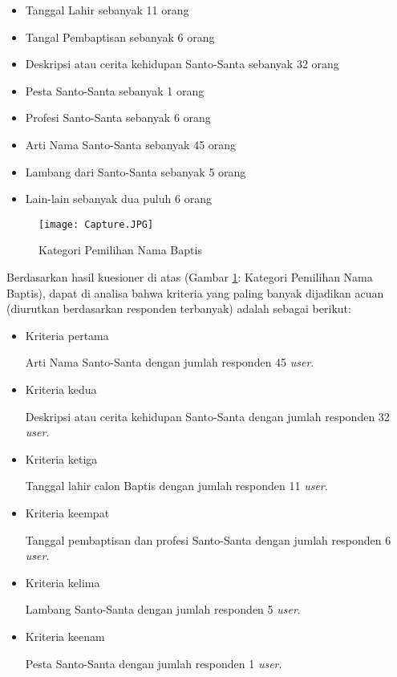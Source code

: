 \documentclass[a4paper,twoside]{article}
\begin{document}
\begin{enumerate}
\begin{itemize}
			\item Tanggal Lahir sebanyak 11 orang
			\item Tangal Pembaptisan sebanyak 6 orang
			\item Deskripsi atau cerita kehidupan Santo-Santa sebanyak 32 orang
			\item Pesta Santo-Santa sebanyak 1 orang
			\item Profesi Santo-Santa sebanyak 6 orang
			\item Arti Nama Santo-Santa sebanyak 45 orang
			\item Lambang dari Santo-Santa sebanyak 5 orang
			\item Lain-lain sebanyak dua puluh 6 orang
		\end{itemize}
		
	\begin{figure}[htbp]
		\centering
			\texttt{[image: Capture.JPG]}
			\caption{Kategori Pemilihan Nama Baptis}
		\label{fig:Capture}
	\end{figure}

	Berdasarkan hasil kuesioner di atas (Gambar \ref{fig:Capture}: Kategori Pemilihan Nama Baptis), dapat di analisa bahwa kriteria yang paling banyak dijadikan acuan (diurutkan berdasarkan responden terbanyak) adalah sebagai berikut:
	
	\begin{itemize}
		\item Kriteria pertama 
		
		Arti Nama Santo-Santa dengan jumlah responden 45 \textit{user}.
		\item Kriteria kedua 
		
		Deskripsi atau cerita kehidupan Santo-Santa dengan jumlah responden 32 \textit{user}.
		\item Kriteria ketiga 
		
		Tanggal lahir calon Baptis dengan jumlah responden 11 \textit{user}.
		\item Kriteria keempat 
			
			Tanggal pembaptisan dan profesi Santo-Santa dengan jumlah responden 6 \textit{user}.
		\item Kriteria kelima
		
		Lambang Santo-Santa dengan jumlah responden 5 \textit{user}.
		\item Kriteria keenam
		
		Pesta Santo-Santa dengan jumlah responden 1 \textit{user}.
	\end{itemize}
	

\end{enumerate}
\end{document}
